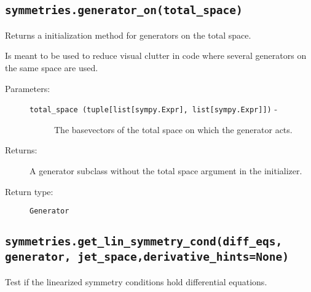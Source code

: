 \subsection*{\lstinline{symmetries.generator_on(total_space)}}

   Returns a initialization method for generators on the total space.

   Is meant to be used to reduce visual clutter in code where several
   generators on the same space are used.

   \begin{description}
      \item[Parameters:] \leavevmode
        \begin{description}
            \item[\lstinline{total_space (tuple[list[sympy.Expr], list[sympy.Expr]])} -] The base\newline vectors of the total space on which the generator acts.
        \end{description}
      \item[Returns:] A generator subclass without the total space argument in the initializer.
      \item[Return type:] \lstinline{Generator}
   \end{description}

\subsection*{\lstinline{symmetries.get_lin_symmetry_cond(diff_eqs, generator, jet_space,}\newline\lstinline{derivative_hints=None)}}

   Test if the linearized symmetry conditions hold differential
   equations.

